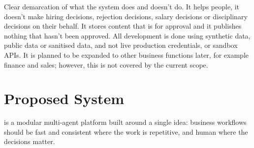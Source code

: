 Clear demarcation of what the system does and doesn't do. It helps people, it doesn't make hiring decisions, rejection decisions, salary decisions or disciplinary decisions on their behalf. It stores content that is for approval and it publishes nothing that hasn't been approved. All development is done using synthetic data, public data or sanitised data, and not live production credentials, or sandbox APIs. It is planned to be expanded to other business functions later, for example finance and sales; however, this is not covered by the current scope.
\section{Proposed System}
\textbf{\ProjectTitle} is a modular multi-agent platform built around a single idea: business workflows should be fast and consistent where the work is repetitive, and human where the decisions matter.

